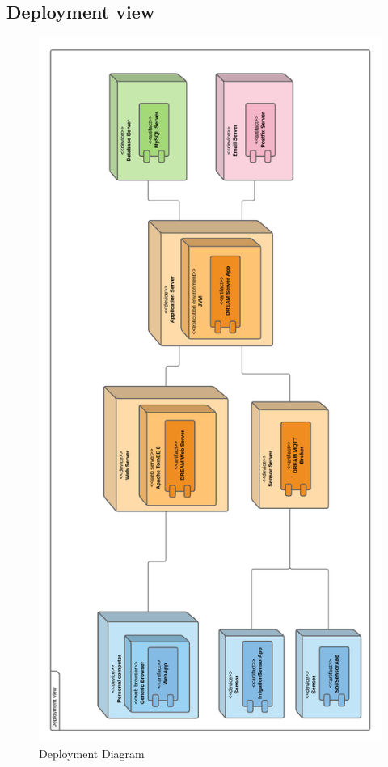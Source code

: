 \documentclass[10pt]{article} %
\begin{document}
\subsection{Deployment view}
\begin{figure}[h]
    \centering
    \includegraphics[scale=0.43]{images/deployment.png}
    \caption{Deployment Diagram}
    \label{fig:deployment}
\end{figure}
\end{document}
